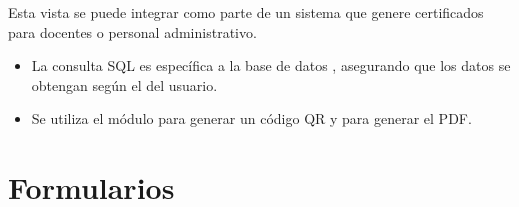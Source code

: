 \documentclass[letterpaper,10pt,spanish]{sphinxmanual}
\begin{document}
\begin{fulllineitems}
\begin{description}
\sphinxAtStartPar
Esta vista se puede integrar como parte de un sistema que genere certificados para docentes o personal administrativo.

\begin{itemize}
\item {} 
\sphinxAtStartPar
La consulta SQL es específica a la base de datos , asegurando que los datos se obtengan según el  del usuario.

\item {} 
\sphinxAtStartPar
Se utiliza el módulo  para generar un código QR y  para generar el PDF.

\end{itemize}

\end{description}

\end{fulllineitems}



\section{Formularios}
\label{\detokenize{cenpe:formularios}}
\end{document}

